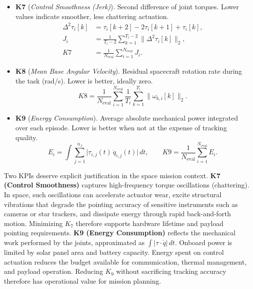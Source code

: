 \documentclass{ieeeaccess}
\begin{document}
\begin{itemize}
  \item \textbf{K7} (\emph{Control Smoothness (Jerk)}). Second difference of joint torques. Lower values indicate smoother,
  less chattering actuation.
  \begin{equation*}
  \begin{aligned}
  \Delta^2\tau_i[k] &= \tau_i[k+2]-2\tau_i[k+1]+\tau_i[k],\\
  J_i &= \frac{1}{T_i-2}\sum_{k=1}^{T_i-2}\|\Delta^2\tau_i[k]\|_2,\\
  K7 &= \frac{1}{N_{\text{eval}}}\sum_{i=1}^{N_{\text{eval}}}J_i.
  \end{aligned}
  \end{equation*}

  \item \textbf{K8} (\emph{Mean Base Angular Velocity}). Residual spacecraft rotation rate during the task (rad/s).
  Lower is better, ideally zero.
  \begin{equation*}
  K8=\frac{1}{N_{\text{eval}}}\sum_{i=1}^{N_{\text{eval}}}\frac{1}{T_i}\sum_{k=1}^{T_i}\|\omega_{b,i}[k]\|_2.
  \end{equation*}

  \item \textbf{K9} (\emph{Energy Consumption}). Average absolute mechanical power integrated over each episode. Lower is
  better when not at the expense of tracking quality.
  \begin{equation*}
  E_i=\int\sum_{j=1}^{n_J}\big|\tau_{i,j}(t)\,\dot q_{i,j}(t)\big|\,dt, \qquad
  K9=\frac{1}{N_{\text{eval}}}\sum_{i=1}^{N_{\text{eval}}} E_i.
  \end{equation*}
\end{itemize}


Two KPIs deserve explicit justification in the space mission context. \textbf{K7 (Control Smoothness)} captures
high-frequency torque oscillations (chattering). In space, such oscillations can accelerate actuator wear, excite structural
vibrations that degrade the pointing accuracy of sensitive instruments such as cameras or star
trackers, and dissipate energy through rapid back-and-forth motion. Minimizing $K_7$ therefore supports hardware lifetime
and payload pointing requirements. \textbf{K9 (Energy Consumption)} reflects the mechanical work performed by the
joints, approximated as $\int |\tau \cdot \dot{q}|\,dt$. Onboard power is limited by solar panel
area and battery capacity. Energy spent on control actuation reduces the budget available for
communication, thermal management, and payload operation. Reducing $K_9$ without sacrificing tracking accuracy therefore has
operational value for mission planning.
\end{document}
